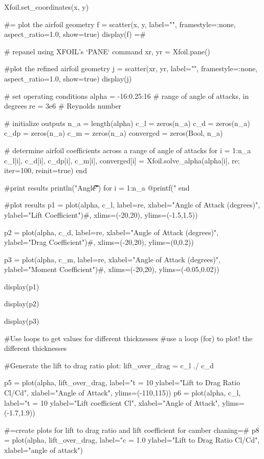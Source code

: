 Xfoil.set_coordinates(x, y)

#= plot the airfoil geometry
f = scatter(x, y, label="", framestyle=:none, aspect_ratio=1.0, show=true)
display(f) =#

# repanel using XFOIL's `PANE` command
xr, yr = Xfoil.pane()

#plot the refined airfoil geometry
j = scatter(xr, yr, label="", framestyle=:none, aspect_ratio=1.0, show=true)
display(j) 

# set operating conditions
alpha = -16:0.25:16 # range of angle of attacks, in degrees
re = 3e6 # Reynolds number

# initialize outputs
n_a = length(alpha)
c_l = zeros(n_a)
c_d = zeros(n_a)
c_dp = zeros(n_a)
c_m = zeros(n_a)
converged = zeros(Bool, n_a)

# determine airfoil coefficients across a range of angle of attacks
for i = 1:n_a
    c_l[i], c_d[i], c_dp[i], c_m[i], converged[i] = Xfoil.solve_alpha(alpha[i], re; iter=100, reinit=true)
end

#print results
println("Angle\t\tCl\t\tCd\t\tCm\t\tConverged")
for i = 1:n_a
    @printf("%
end


#plot results
p1 = plot(alpha, c_l,
    label=re,
    xlabel="Angle of Attack (degrees)",
    ylabel="Lift Coefficient")#, xlims=(-20,20), ylims=(-1.5,1.5))

p2 = plot(alpha, c_d,
    label=re, 
    xlabel="Angle of Attack (degrees)",
    ylabel="Drag Coefficient")#, xlims=(-20,20), ylims=(0,0.2))

p3 = plot(alpha, c_m,
    label=re,
    xlabel="Angle of Attack (degrees)",
    ylabel="Moment Coefficient")#, xlims=(-20,20), ylims=(-0.05,0.02))

display(p1)

display(p2)

display(p3)


#Use loops to get values for different thicknesses
#use a loop (for) to plot! the different thicknesses

#Generate the lift to drag ratio plot:
lift_over_drag = c_l ./ c_d 

p5 = plot(alpha, lift_over_drag,
    label="t = 10%
    ylabel="Lift to Drag Ratio Cl/Cd",
    xlabel="Angle of Attack", ylims=(-110,115))
p6 = plot(alpha, c_l,
    label="t = 10%
    ylabel="Lift coefficient Cl",
    xlabel="Angle of Attack", ylims=(-1.7,1.9))

#=create plots for lift to drag ratio and lift coefficient 
for camber chaning=#
p8 = plot(alpha, lift_over_drag,
    label="c = 1.0%
    ylabel="Lift to Drag Ratio Cl/Cd",
    xlabel="angle of attack")

